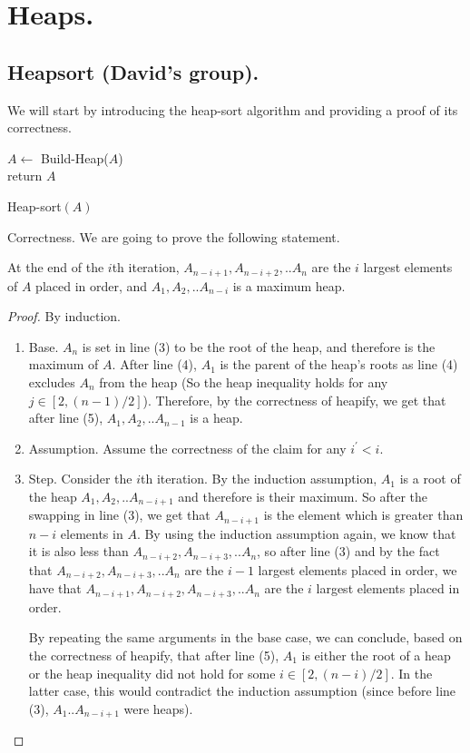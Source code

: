 


\ifdefined\BOOK
\else
\setcounter{chapter}{5}
\fi

\chapter{Heaps.} 
\section{Heapsort (David's group).}

We will start by introducing the heap-sort algorithm and providing a proof of its correctness.

\begin{algorithm}
    $A \leftarrow$ Build-Heap($A$)\\
	  return $A$
\caption{Heap-sort$(A)$}
  \end{algorithm}
Correctness. We are going to prove the following statement.
  \begin{claim}   
At the end of the $i$th iteration, $A_{n-i+1},A_{n-i+2},..A_{n}$ are the $i$ largest elements of $A$ placed in order, and $A_{1},A_{2},..A_{n-i}$ is a maximum heap.
  \end{claim}
\begin{proof}
By induction.
\begin{enumerate}
  \item Base. $A_{n}$ is set in line (3) to be the root of the heap, and therefore is the maximum of $A$. After line (4), $A_{1}$ is the parent of the heap's roots as line (4) excludes $A_{n}$ from the heap (So the heap inequality holds for any $j\in [2,(n-1)/2]$). Therefore, by the correctness of heapify, we get that after line (5), $A_{1},A_{2},..A_{n-1}$ is a heap.
  \item Assumption. Assume the correctness of the claim for any $i^{\prime}<i$.
  \item Step. Consider the $i$th iteration. By the induction assumption, $A_{1}$ is a root of the heap $A_{1},A_{2},..A_{n-i+1}$ and therefore is their maximum. So after the swapping in line (3), we get that $A_{n-i+1}$ is the element which is greater than $n-i$ elements in $A$. By using the induction assumption again, we know that it is also less than $A_{n-i+2},A_{n-i+3},..A_{n}$, so after line (3) and by the fact that $A_{n-i+2},A_{n-i+3},..A_{n}$ are the $i-1$ largest elements placed in order, we have that $A_{n-i+1},A_{n-i+2},A_{n-i+3},..A_{n}$ are the $i$ largest elements placed in order. 

    By repeating the same arguments in the base case, we can conclude, based on the correctness of heapify, that after line (5), $A_{1}$ is either the root of a heap or the heap inequality did not hold for some $i\in [2,(n-i)/2]$. In the latter case, this would contradict the induction assumption (since before line (3), $A_{1}..A_{n-i+1}$ were heaps).
\end{enumerate}
\end{proof}






